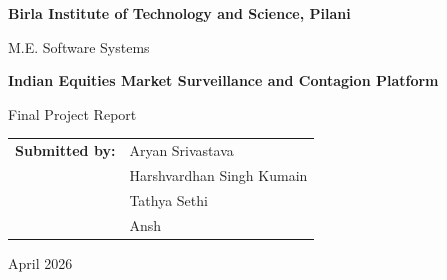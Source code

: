 \documentclass[11pt,a4paper]{article}
\begin{document}
\begin{titlepage}
    \centering
    \vspace*{1.5cm}

    {\Large \textbf{Birla Institute of Technology and Science, Pilani}\par}
    \vspace{0.4cm}
    {\large M.E. Software Systems\par}
    \vspace{1.7cm}

    {\Huge \textbf{Indian Equities Market Surveillance and Contagion Platform}\par}
    \vspace{0.6cm}
    {\Large Final Project Report\par}
    \vspace{1.2cm}

    \vspace{1.5cm}

    \begin{tabular}{ll}
        \textbf{Submitted by:} & Aryan Srivastava \\
                               & Harshvardhan Singh Kumain \\
                               & Tathya Sethi \\
                               & Ansh \\
    \end{tabular}

    \vfill

    {\large April 2026\par}
\end{titlepage}

\onehalfspacing
\end{document}

